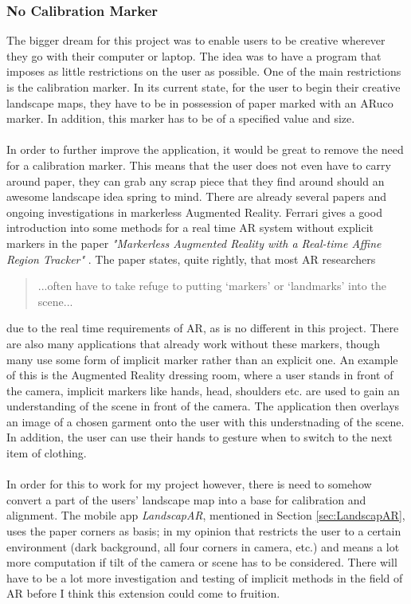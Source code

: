\documentclass[11pt]{article}
\begin{document}
\subsubsection{No Calibration Marker}
The bigger dream for this project was to enable users to be creative 
wherever they go with their computer or laptop. The idea was to have a
program that imposes as little restrictions on the user as 
possible. One of the main restrictions is the calibration marker. In its
current state, for the user to begin their creative landscape maps, they
have to be in possession of paper marked with an ARuco marker. In addition,
this marker has to be of a specified value and size. \\
\\
In order to further improve the application, it would be great to remove 
the need for a calibration marker. This means that the user does not even 
have to carry around paper, they can grab any scrap piece that they find 
around should an awesome landscape idea spring to mind. There are already
several papers and ongoing
investigations in markerless Augmented Reality. Ferrari
gives a good introduction into some methods for a real time AR
system without explicit markers in the paper \textit{"Markerless Augmented 
Reality with a Real-time Affine Region Tracker"} \cite{Ferrari}. 
The paper states, quite rightly, that most AR researchers

\begin{quote}
	...often have to take refuge to putting ‘markers’ or 
	‘landmarks’ into the scene...
\end{quote}
 
due to the real time requirements of AR, as is no different in this project.
There are also many applications that already work without these markers,
though many use some form of implicit marker rather than an explicit one.
An example of this is the Augmented Reality dressing room, where a user 
stands in front of the camera, implicit markers like hands, head, shoulders
etc. are used to gain an understanding of the scene in front of the camera.
The application then overlays an image of a chosen garment onto the user
with this understnading of the scene. In addition, the user can use
their hands to gesture when to switch to the next item of clothing.\\
\\
In order for this to work for my project however, there is need to
somehow convert a part of the users' landscape map into a base for 
calibration and alignment. The mobile app \textit{LandscapAR}, mentioned
in Section \ref{sec:LandscapAR}, uses the paper corners as basis; in my
opinion that restricts the user to a certain environment (dark background,
all four corners in camera, etc.) and means a lot more computation if
tilt of the camera or scene has to be considered. There will have to be
a lot more investigation and testing of implicit methods in the field of
AR before I think this extension could come to fruition.
\end{document}
